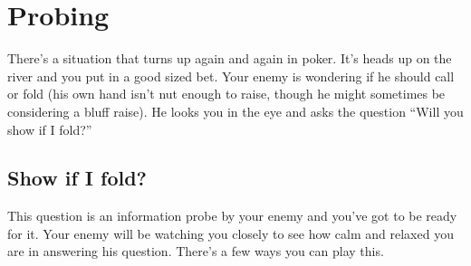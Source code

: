 \chapter{Probing}


There's a situation that turns up again and again in poker.
It's heads up on the river and you put in a good sized bet.
Your enemy is wondering if he should call or fold (his own hand
isn't nut enough to raise, though he might sometimes be considering a
bluff raise). He looks you in the eye and asks the question ``Will you
show if I fold?''

\section{Show if I fold?}

This question is an information probe by your enemy and you've got
to be ready for it. Your enemy will be watching you closely
to see how calm and relaxed you are in answering his question.
There's a few ways you can play this.

